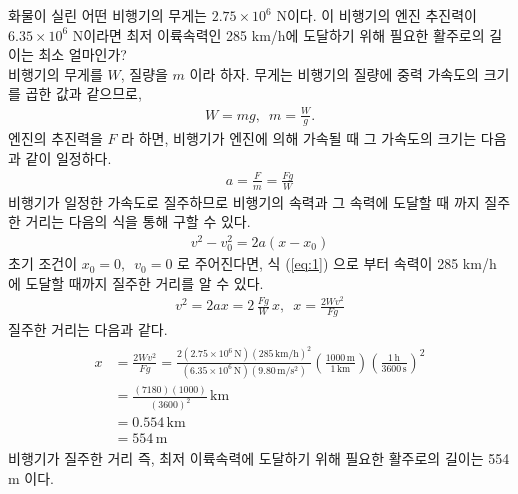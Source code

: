 \documentclass[floatfix,nofootinbib,superscriptaddress,fleqn,preprint]{revtex4}
\begin{document}
화물이 실린 어떤 비행기의 무게는 $2.75\times
10^6$ N이다. 이 비행기의 엔진 추진력이 $6.35\times10^6$ N이라면 최저
이륙속력인 285 km/h에 도달하기 위해 필요한 활주로의 길이는 최소
얼마인가?  \\

 비행기의 무게를 $W$, 질량을 $m$ 이라 하자. 
무게는 비행기의 질량에 중력 가속도의 크기를
곱한 값과 같으므로,
\begin{align}
  W=mg,\,\,\,m=\frac{W}{g}.
\end{align}
엔진의 추진력을 $F$ 라 하면, 비행기가 엔진에 의해 가속될 때 
그 가속도의 크기는 다음과 같이 일정하다.
\begin{align}
  a=\frac{F}{m}=\frac{Fg}{W}
\end{align}
비행기가 일정한 가속도로 질주하므로 비행기의 속력과 그 속력에
도달할 때 까지 질주한 거리는 다음의 식을 통해 구할 수 있다.
\begin{align}\label{eq:1}
 v^2-v^2_0 = 2a(x-x_0) 
\end{align}
초기 조건이 $x_0=0,\,\,\,v_0=0$ 로 주어진다면, 식 (\ref{eq:1}) 으로
부터 속력이 285 km/h 에 도달할 때까지 질주한 거리를 알 수 있다.
\begin{align}
    v^2 = 2ax = 2\,\frac{Fg}{W}\,x,\,\,\,
    x=\frac{2Wv^2}{Fg}
\end{align}
질주한 거리는 다음과 같다.
\begin{align}
  \begin{split}
    x&=\frac{2Wv^2}{Fg}
    =\frac{2(2.75\times 10^6\,\mathrm{N}){(285\,\mathrm{km/h})}^2}
    {(6.35\times 10^6\,\mathrm{N})(9.80\,\mathrm{m/s^2})}
    \left(\frac{1000\,\mathrm{m}}{1\,\mathrm{km}}\right)
    \left(\frac{1\,\mathrm{h}}{3600\,\mathrm{s}}\right)^2 \\
    &=\frac{(7180)(1000)}{(3600)^2}\,\mathrm{km}  \\
    &=0.554\,\mathrm{km} \\
    &= 554\,\mathrm{m}
  \end{split}
\end{align}
비행기가 질주한 거리 즉, 최저 이륙속력에 도달하기 위해 필요한 
활주로의 길이는 554 m 이다.

\vspace{2cm}
\end{document}
